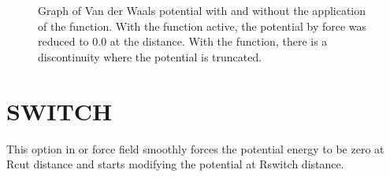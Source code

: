 \documentclass[letterpaper,10pt,english]{sphinxmanual}
\begin{document}
\begin{description}
\begin{figure}[htbp]
\noindent{}
\caption{Graph of Van der Waals potential with and without the application of the  function. With the  function active, the potential by force was reduced to 0.0 at the  distance. With the  function, there is a discontinuity where the potential is truncated.}\label{\detokenize{vdw_energy:id2}}\end{figure}

\end{description}


\section{SWITCH}
\label{\detokenize{vdw_energy:switch}}
This option in  or  force field smoothly forces the potential energy to be zero at Rcut distance and starts modifying the potential at Rswitch distance.
\end{document}
